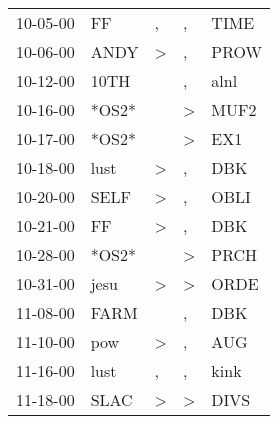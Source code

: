 \begin{supertabular}{p{0.07\textwidth}p{0.06\textwidth}p{0.02\textwidth}p{0.02\textwidth}p{0.06\textwidth}}
          10-05-00\textsuperscript{} &             FF\textsuperscript{} &                , &                , &           TIME\textsuperscript{} \\
          10-06-00\textsuperscript{} &           ANDY\textsuperscript{} &     \textgreater &                , &           PROW\textsuperscript{} \\
          10-12-00\textsuperscript{} &           10TH\textsuperscript{} &                  &                , &           alnl\textsuperscript{} \\
          10-16-00\textsuperscript{} &                            *OS2* &                  &     \textgreater &           MUF2\textsuperscript{} \\
          10-17-00\textsuperscript{} &                            *OS2* &                  &     \textgreater &            EX1\textsuperscript{} \\
          10-18-00\textsuperscript{} &           lust\textsuperscript{} &     \textgreater &                , &            DBK\textsuperscript{} \\
          10-20-00\textsuperscript{} &           SELF\textsuperscript{} &     \textgreater &                , &           OBLI\textsuperscript{} \\
          10-21-00\textsuperscript{} &             FF\textsuperscript{} &     \textgreater &                , &            DBK\textsuperscript{} \\
          10-28-00\textsuperscript{} &                            *OS2* &                  &     \textgreater &           PRCH\textsuperscript{} \\
          10-31-00\textsuperscript{} &           jesu\textsuperscript{} &     \textgreater &     \textgreater &           ORDE\textsuperscript{} \\
          11-08-00\textsuperscript{} &           FARM\textsuperscript{} &                  &                , &            DBK\textsuperscript{} \\
          11-10-00\textsuperscript{} &            pow\textsuperscript{} &     \textgreater &                , &            AUG\textsuperscript{} \\
          11-16-00\textsuperscript{} &           lust\textsuperscript{} &                , &                , &           kink\textsuperscript{} \\
          11-18-00\textsuperscript{} &           SLAC\textsuperscript{} &     \textgreater &     \textgreater &           DIVS\textsuperscript{} \\

\end{supertabular}
